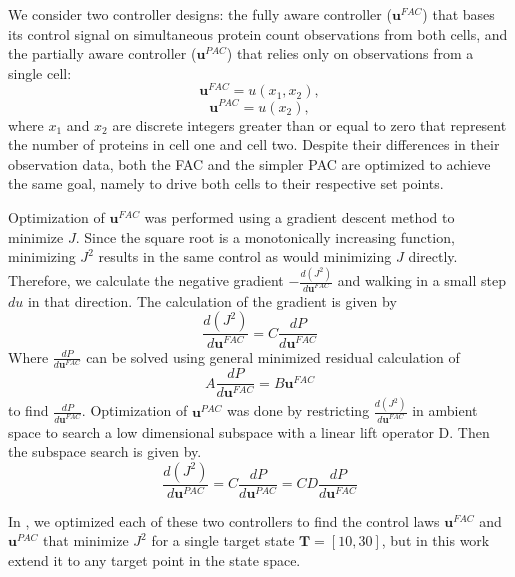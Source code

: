 \documentclass[12pt]{iopart}
\begin{document}
We consider two controller designs: the fully aware controller ($\mathbf{u}^{FAC}$) that bases its control signal on simultaneous protein count observations from both cells, and the partially aware controller ($\mathbf{u}^{PAC}$) that relies only on observations from a single cell:
\begin{equation}
\mathbf{u}^{FAC}=u(x_1,x_2),
\end{equation}
\begin{equation}
\mathbf{u}^{PAC}=u(x_2),
\end{equation}
where $x_1$ and $x_2$ are discrete integers greater than or equal to zero that represent the number of proteins in cell one and cell two. Despite their differences in their observation data, both the FAC and the simpler PAC are optimized to achieve the same goal, namely to drive both cells to their respective set points.

Optimization of $\mathbf{u}^{FAC}$ was performed using a gradient descent method to minimize $J$. Since the square root is a monotonically increasing function, minimizing $J^2$ results in the same control as would minimizing $J$ directly. Therefore, we calculate the negative gradient $-\frac{d(J^2)}{d\mathbf{u}^{FAC}}$ and walking in a small step $du$ in that direction. The calculation of the gradient is given by
\begin{equation}
\frac{d(J^2)}{d\mathbf{u}^{FAC}}=C \frac{dP}{d\mathbf{u}^{FAC}}
\end{equation}
Where $\frac{dP}{d\mathbf{u}^{FAC}}$ can be solved using general minimized residual calculation of
\begin{equation}
A \frac{dP}{d\mathbf{u}^{FAC}}=B \mathbf{u}^{FAC}
\end{equation}
to find $\frac{dP}{d\mathbf{u}^{FAC}}$.
Optimization of $\mathbf{u}^{PAC}$ was done by restricting $\frac{d(J^2)}{d\mathbf{u}^{FAC}}$ in ambient space to search a low dimensional subspace with a linear lift operator D. Then the subspace search is given by. 
\begin{equation}
\frac{d(J^2)}{d\mathbf{u}^{PAC}}=C \frac{dP}{d\mathbf{u}^{PAC}} = C D \frac{dP}{d\mathbf{u}^{FAC}}  
\end{equation}

In \cite{May2021}, we optimized each of these two controllers to find the control laws $\mathbf{u}^{FAC}$ and $\mathbf{u}^{PAC}$ that minimize $J^2$ for a single target state $\mathbf{T} = [10,30]$, but in this work extend it to any target point in the state space.
\end{document}
